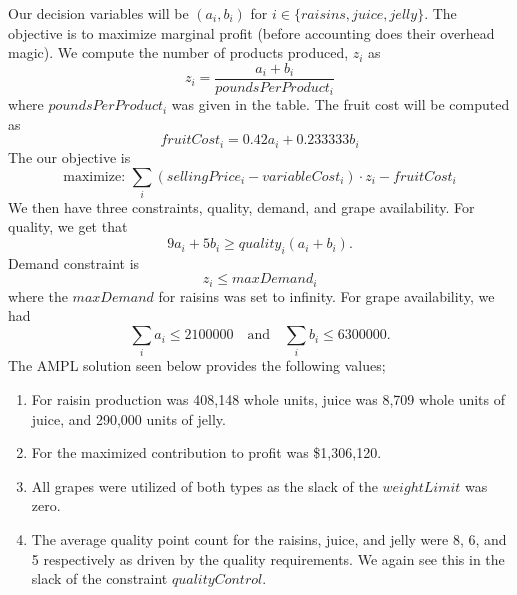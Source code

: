 \documentclass[11pt]{article}
\begin{document}
\begin{enumerate}
\begin{enumerate}
Our decision variables will be $(a_i,b_i)$ for $i\in\{raisins, juice, jelly\}$.  The objective is to maximize marginal profit (before accounting does their overhead magic).  We compute the number of products produced, $z_i$ as
\[
z_i = \frac{a_i+b_i}{poundsPerProduct_i}
\]
where $poundsPerProduct_i$ was given in the table.  The fruit cost will be computed as 
\[
fruitCost_i = 0.42a_i+0.233333b_i
\]
The our objective is
\[
\text{maximize: }\sum_{i}\left(sellingPrice_i-variableCost_i\right)\cdot z_i - fruitCost_i 
\]
We then have three constraints, quality, demand, and grape availability.  For quality, we get that
\[
9a_i+5b_i \geq quality_i(a_i+b_i).
\]
Demand constraint is
\[
z_i \leq maxDemand_i
\]
where the $maxDemand$ for raisins was set to infinity.  For grape availability, we had
\[
\sum_i a_i \leq 2 100 000\quad\text{and}\quad\sum_ib_i \leq 6 300 000.
\]
The AMPL solution seen below provides the following values;  
\begin{enumerate}
\item For raisin production was 408,148 whole units, juice was 8,709 whole units of juice, and 290,000 units of jelly.
\item For the maximized contribution to profit was \$1,306,120.
\item All grapes were utilized of both types as the slack of the $weightLimit$ was zero.
\item The average quality point count for the raisins, juice, and jelly were 8, 6, and 5 respectively as driven by the quality requirements.  We again see this in the slack of the constraint $qualityControl$.
\end{enumerate}


\end{enumerate}
\end{enumerate}
\end{document}
